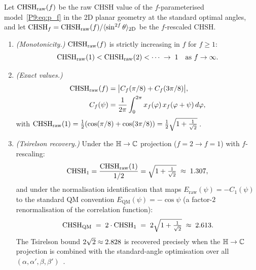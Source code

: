\begin{theorem}
\label{P9:thm:chsh_f}
Let $\mathrm{CHSH}_\mathrm{raw}(f)$ be the raw CHSH value of the $f$-parameterised
model~\eqref{P9:eq:p_f} in the 2D planar geometry at the standard optimal angles,
and let $\mathrm{CHSH}_f = \mathrm{CHSH}_\mathrm{raw}(f)/\langle\sin^{2f}\theta\rangle_\mathrm{2D}$
be the $f$-rescaled CHSH.
 
\begin{enumerate}[label=\emph{(\roman*)}]
  \item \emph{(Monotonicity.)}
    $\mathrm{CHSH}_\mathrm{raw}(f)$ is strictly increasing in $f$ for $f\geq1$:
    \begin{equation}
      \mathrm{CHSH}_\mathrm{raw}(1) < \mathrm{CHSH}_\mathrm{raw}(2) < \cdots
      \;\to\; 1 \quad\text{as }f\to\infty.
      \label{P9:eq:CHSH_monotone}
    \end{equation}
 
  \item \emph{(Exact values.)}
    \begin{align}
      \mathrm{CHSH}_\mathrm{raw}(f)
      &= \bigl|C_f(\pi/8) + C_f(3\pi/8)\bigr|,
      \label{P9:eq:CHSH_exact_f}\\
      C_f(\psi)
      &= \frac{1}{2\pi}\int_0^{2\pi} x_f(\varphi)\,x_f(\varphi+\psi)\,d\varphi,
      \nonumber
    \end{align}
    with $\mathrm{CHSH}_\mathrm{raw}(1) = \tfrac{1}{2}(\cos(\pi/8)+\cos(3\pi/8))
    = \tfrac{1}{2}\sqrt{1+\tfrac{1}{\sqrt{2}}}\,$.
 
  \item \emph{(Tsirelson recovery.)}
    Under the $\mathbb{H}\to\mathbb{C}$ projection ($f=2\to f=1$) with $f$-rescaling:
    \begin{equation}
      \mathrm{CHSH}_1
      = \frac{\mathrm{CHSH}_\mathrm{raw}(1)}{1/2}
      = \sqrt{1+\tfrac{1}{\sqrt{2}}} \;\approx\; 1.307,
      \label{P9:eq:CHSH_f1_rescaled}
    \end{equation}
    and under the normalisation identification that maps
    $E_\mathrm{raw}(\psi) = -C_1(\psi)$ to the standard QM convention
    $E_\mathrm{QM}(\psi) = -\cos\psi$ (a factor-$2$ renormalisation of
    the correlation function):
    \begin{equation}
      \mathrm{CHSH}_\mathrm{QM} \;=\; 2\cdot\mathrm{CHSH}_1
      \;=\; 2\sqrt{1+\tfrac{1}{\sqrt{2}}} \;\approx\; 2.613.
      \label{P9:eq:norm_id}
    \end{equation}
    The Tsirelson bound $2\sqrt{2}\approx2.828$ is recovered precisely
    when the $\mathbb{H}\to\mathbb{C}$ projection is combined with the standard-angle
    optimisation over all $(\alpha,\alpha',\beta,\beta')$~\cite{Tsirelson1980}.
\end{enumerate}
\end{theorem}

